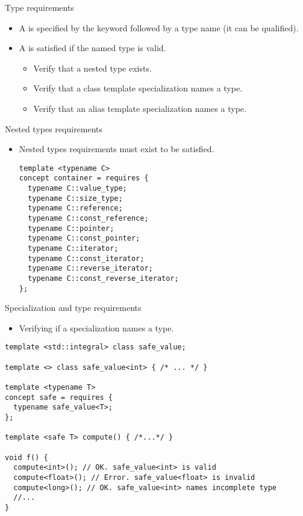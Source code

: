 \begin{frame}[t,fragile]{Type requirements}
\begin{itemize}
  \item A  is specified by the keyword
         followed by a type name (it can be qualified).

  \item A  is satisfied if the named type is valid.
    \begin{itemize}
      \item Verify that a nested type exists.
      \item Verify that a class template specialization names a type.
      \item Verify that an alias template specialization names a type.
    \end{itemize}
\end{itemize}
\end{frame}

\begin{frame}[t,fragile]{Nested types requirements}
\begin{itemize}
  \item Nested types requirements must exist to be satisfied.
\begin{lstlisting}
template <typename C>
concept container = requires {
  typename C::value_type;
  typename C::size_type;
  typename C::reference;
  typename C::const_reference;
  typename C::pointer;
  typename C::const_pointer;
  typename C::iterator;
  typename C::const_iterator;
  typename C::reverse_iterator;
  typename C::const_reverse_iterator;
};
\end{lstlisting}
\end{itemize}
\end{frame}

\begin{frame}[t,fragile]{Specialization and type requirements}
\begin{itemize}
  \item Verifying if a specialization names a type.
\end{itemize}
\begin{lstlisting}
template <std::integral> class safe_value;

template <> class safe_value<int> { /* ... */ }

template <typename T>
concept safe = requires {
  typename safe_value<T>;
};

template <safe T> compute() { /*...*/ }

void f() {
  compute<int>(); // OK. safe_value<int> is valid
  compute<float>(); // Error. safe_value<float> is invalid
  compute<long>(); // OK. safe_value<int> names incomplete type
  //...
}
\end{lstlisting}
\end{frame}

